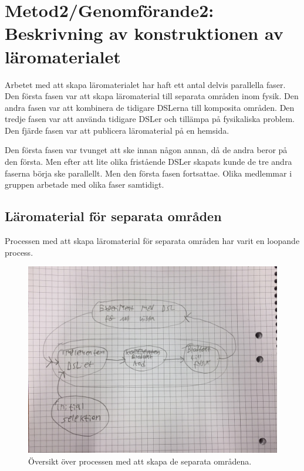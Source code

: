 
\chapter{Metod2/Genomförande2: Beskrivning av konstruktionen av läromaterialet}
\begin{binge}

Arbetet med att skapa läromaterialet har haft ett antal delvis parallella faser. Den första fasen var att skapa läromaterial till separata områden inom fysik. Den andra fasen var att kombinera de tidigare DSLerna till komposita områden. Den tredje fasen var att använda tidigare DSLer och tillämpa på fysikaliska problem. Den fjärde fasen var att publicera läromaterial på en hemsida.

Den första fasen var tvunget att ske innan någon annan, då de andra beror på den första. Men efter att lite olika fristående DSLer skapats kunde de tre andra faserna börja ske parallellt. Men den första fasen fortsattae. Olika medlemmar i gruppen arbetade med olika faser samtidigt.

\section{Läromaterial för separata områden}

Processen med att skapa läromaterial för separata områden har varit en loopande process.

\begin{figure}
  \includegraphics[width=\linewidth]{figure/floedesplan.jpg}
  \caption{Översikt över processen med att skapa de separata områdena.}
  \label{fig:oeversikt_separata}
\end{figure}


\end{binge}
